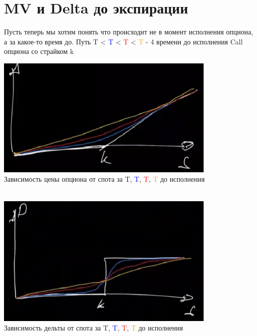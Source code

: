 \documentclass{article}
\begin{document}
\section{MV и Delta до экспирации}
Пусть теперь мы хотим понять что происходит не в момент исполнения опциона, а за какое-то время до.
Путь T < \textcolor{blue}{T} < \textcolor{red}{T} < \textcolor{orange}{T} - 4 времени до исполнения Call опциона со страйком k
\begin{center}
\includegraphics[width=300pt]{picture_3.png}\\
\caption{Зависимость цены опциона от спота за T, \textcolor{blue}{T}, \textcolor{red}{T}, \textcolor{orange}{T} до исполнения}\\
\bigskip
\bigskip
\includegraphics[width=300pt]{picture_4.png}\\
\caption{Зависимость дельты от спота за T, \textcolor{blue}{T}, \textcolor{red}{T}, \textcolor{orange}{T} до исполнения}\\

\end{center}  
\newpage
\end{document}

